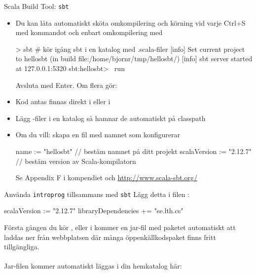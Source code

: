 \begin{Slide}{Scala Build Tool: \texttt{sbt}}\SlideFontSmall
\begin{itemize}
\item Du kan låta  automatiskt sköta omkompilering och körning vid varje Ctrl+S med kommandot 
och enbart omkompilering med 
\begin{REPL}
> sbt              # kör igång sbt i en katalog med .scala-filer
[info] Set current project to hellosbt (in build file:/home/bjornr/tmp/hellosbt/)
[info] sbt server started at 127.0.0.1:5320
sbt:hellosbt> ~run
\end{REPL}
Avsluta med Enter. Om flera  gör: 
\item Kod antas finnas direkt i  eller i 
\item Lägg -filer i en katalog  så hamnar de automatiskt på classpath
\item Om du vill: skapa en fil med namnet  som konfigurerar 
\begin{Code}
name := "hellosbt"          // bestäm namnet på ditt projekt
scalaVersion := "2.12.7"    // bestäm version av Scala-kompilatorn
\end{Code}
Se Appendix F i kompendiet och \url{http://www.scala-sbt.org/}
\end{itemize}
\end{Slide}



\begin{Slide}{Använda \texttt{introprog} tillsammans med \texttt{sbt}}
Lägg detta i filen :
\begin{Code}
scalaVersion := "2.12.7"
libraryDependencies += "se.lth.cs" %
\end{Code}
Första gången du kör ,  eller  i  kommer en jar-fil med paketet  automatiskt att laddas ner från webbplatsen  där många öppenkällkodspaket finns fritt tillgängliga. \\~\\

Jar-filen kommer automatiskt läggas i din hemkatalog här: \\
\end{Slide}


